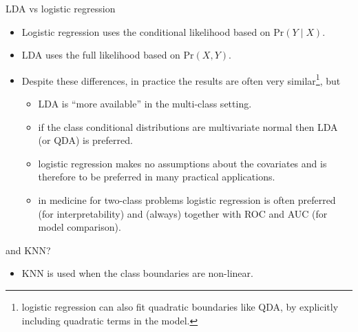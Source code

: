 \documentclass[10pt,ignorenonframetext,]{beamer}
\providecommand{\tightlist}{%
  \setlength{\itemsep}{0pt}\setlength{\parskip}{0pt}}
\begin{document}
\begin{frame}

\begin{block}{LDA vs logistic regression}

\begin{itemize}
\item
  Logistic regression uses the conditional likelihood based on
  \(\text{Pr}(Y \mid X)\).
\item
  LDA uses the full likelihood based on \(\text{Pr}(X,Y)\).
\item
  Despite these differences, in practice the results are often very
  similar\footnote{logistic regression can also fit quadratic boundaries
  like QDA, by explicitly including quadratic terms in the model.}, but

  \begin{itemize}
  \tightlist
  \item
    LDA is ``more available'' in the multi-class setting.
  \item
    if the class conditional distributions are multivariate normal then
    LDA (or QDA) is preferred.
  \item
    logistic regression makes no assumptions about the covariates and is
    therefore to be preferred in many practical applications.
  \item
    in medicine for two-class problems logistic regression is often
    preferred (for interpretability) and (always) together with ROC and
    AUC (for model comparison).
  \end{itemize}
\end{itemize}

\end{block}

\begin{block}{and KNN?}

\begin{itemize}
\tightlist
\item
  KNN is used when the class boundaries are non-linear.
\end{itemize}

\end{block}

\end{frame}
\end{document}
